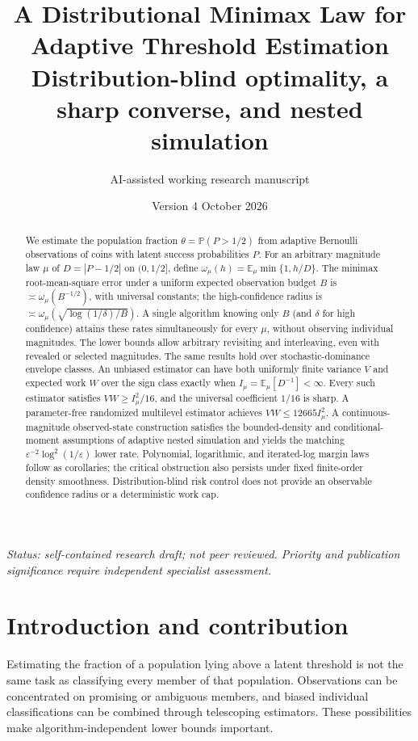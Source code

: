 \documentclass[11pt,a4paper]{article}
\title{\vspace{-1.2em}\textbf{A Distributional Minimax Law for\\Adaptive Threshold Estimation}\\[0.4em]\large Distribution-blind optimality, a sharp converse, and nested simulation}
\author{AI-assisted working research manuscript}
\date{Version 4 \quad\textbullet\quad 26 October 2026}
\theoremstyle{definition}
\newcommand{\E}{\mathbb E}
\newcommand{\Prob}{\mathbb P}
\begin{document}
\maketitle
\thispagestyle{plain}
\begin{abstract}
We estimate the population fraction $\theta=\Prob(P>1/2)$ from adaptive
Bernoulli observations of coins with latent success probabilities $P$.
For an arbitrary magnitude law $\mu$ of $D=|P-1/2|$ on $(0,1/2]$, define
$\omega_\mu(h)=\E_\mu\min\{1,h/D\}$.
The minimax root-mean-square error under a uniform expected observation
budget $B$ is $\asymp\omega_\mu(B^{-1/2})$, with universal constants; the
high-confidence radius is
$\asymp\omega_\mu(\sqrt{\log(1/\delta)/B})$.
A single algorithm knowing only $B$ (and $\delta$ for high confidence)
attains these rates simultaneously for every $\mu$, without observing
individual magnitudes. The lower bounds allow arbitrary revisiting and
interleaving, even with revealed or selected magnitudes. The same results
hold over stochastic-dominance envelope classes.
An unbiased estimator can have both uniformly finite variance $V$ and
expected work $W$ over the sign class exactly when
$I_\mu=\E_\mu[D^{-1}]<\infty$. Every such estimator satisfies
$VW\ge I_\mu^2/16$, and the universal coefficient $1/16$ is sharp.
A parameter-free randomized multilevel estimator achieves
$VW\le12665 I_\mu^2$.
A continuous-magnitude observed-state construction satisfies the bounded-density
and conditional-moment assumptions of adaptive nested simulation and yields
the matching $\varepsilon^{-2}\log^2(1/\varepsilon)$ lower rate.
Polynomial, logarithmic, and iterated-log margin laws follow as corollaries;
the critical obstruction also persists under fixed finite-order density
smoothness. Distribution-blind risk control does not provide an observable
confidence radius or a deterministic work cap.
\end{abstract}
\begin{center}
\small\textit{Status: self-contained research draft; not peer reviewed.
Priority and publication significance require independent specialist assessment.}
\end{center}

\section{Introduction and contribution}
Estimating the fraction of a population lying above a latent threshold is
not the same task as classifying every member of that population. Observations
can be concentrated on promising or ambiguous members, and biased individual
classifications can be combined through telescoping estimators. These
possibilities make algorithm-independent lower bounds important.
\end{document}
